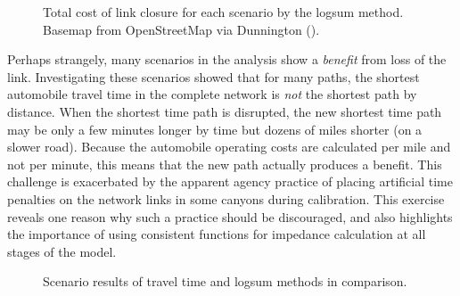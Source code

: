 \documentclass[]{ascelike-new}
\begin{document}
\begin{figure}

\begin{minipage}{\linewidth}



\end{minipage}%
\newline
\begin{minipage}{\linewidth}



\end{minipage}%

\caption{\label{fig-linksmap}Total cost of link closure for each
scenario by the logsum method. Basemap from OpenStreetMap via Dunnington
().}

\end{figure}%

Perhaps strangely, many scenarios in the analysis show a \emph{benefit}
from loss of the link. Investigating these scenarios showed that for
many paths, the shortest automobile travel time in the complete network
is \emph{not} the shortest path by distance. When the shortest time path
is disrupted, the new shortest time path may be only a few minutes
longer by time but dozens of miles shorter (on a slower road). Because
the automobile operating costs are calculated per mile and not per
minute, this means that the new path actually produces a benefit. This
challenge is exacerbated by the apparent agency practice of placing
artificial time penalties on the network links in some canyons during
calibration. This exercise reveals one reason why such a practice should
be discouraged, and also highlights the importance of using consistent
functions for impedance calculation at all stages of the model.

\begin{figure}


\caption{\label{fig-traveltimerank}Scenario results of travel time and
logsum methods in comparison.}

\end{figure}%
\end{document}
